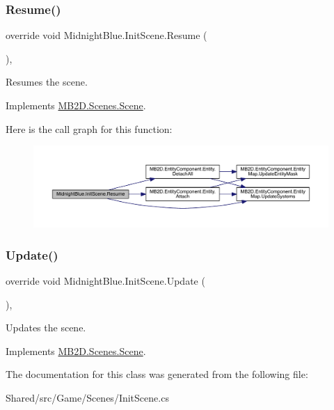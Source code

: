 \subsubsection{\texorpdfstring{Resume()}{Resume()}}
{\footnotesize\ttfamily override void Midnight\+Blue.\+Init\+Scene.\+Resume (\begin{DoxyParamCaption}{ }\end{DoxyParamCaption})\hspace{0.3cm}{\ttfamily [inline]}, {\ttfamily [virtual]}}



Resumes the scene. 



Implements \hyperlink{class_m_b2_d_1_1_scenes_1_1_scene_ad13639db22b059a1b714eefd9d927735}{M\+B2\+D.\+Scenes.\+Scene}.

Here is the call graph for this function\+:\nopagebreak
\begin{figure}[H]
\begin{center}
\leavevmode
\includegraphics[width=350pt]{class_midnight_blue_1_1_init_scene_a01ade76252a492d20181bd2e00eb217f_cgraph}
\end{center}
\end{figure}
\hypertarget{class_midnight_blue_1_1_init_scene_ad87861fb4f2a30f5168f6133aa10d3f4}{}\label{class_midnight_blue_1_1_init_scene_ad87861fb4f2a30f5168f6133aa10d3f4} 
\subsubsection{\texorpdfstring{Update()}{Update()}}
{\footnotesize\ttfamily override void Midnight\+Blue.\+Init\+Scene.\+Update (\begin{DoxyParamCaption}{ }\end{DoxyParamCaption})\hspace{0.3cm}{\ttfamily [inline]}, {\ttfamily [virtual]}}



Updates the scene. 



Implements \hyperlink{class_m_b2_d_1_1_scenes_1_1_scene_a779de7c1ab23b698dcde3a228324a991}{M\+B2\+D.\+Scenes.\+Scene}.



The documentation for this class was generated from the following file\+:\begin{DoxyCompactItemize}
\item 
Shared/src/\+Game/\+Scenes/Init\+Scene.\+cs\end{DoxyCompactItemize}
